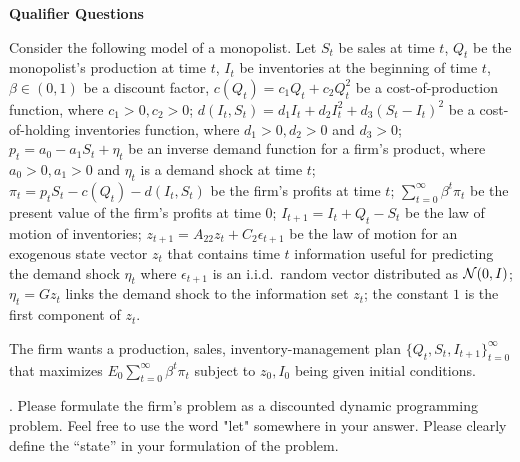 



\paper

\overfullrule=0pt
\def\frac#1#2{#1\over #2}
%
\def\bmatrix#1{\left[ \matrix{#1} \right]}
\def\be{{\beta}}
\def\toone{{t+1}}

\overfullrule=0pt

%

\centerline{\bf Qualifier Questions}




\medskip
{}
  Consider the following model of a monopolist.  Let  $S_t$ be sales at time $t$, $Q_t$ be the monopolist's production  at time $t$,
 $I_t$ be inventories at the beginning of time $t$,  $\beta \in (0,1)$ be a discount factor,  $c(Q_t) = c_1 Q_t + c_2 Q_t^2$ be a cost-of-production function, where $c_1>0, c_2>0$;
  $d(I_t, S_t) = d_1 I_t + d_2 I_t^2  + d_3 (S_t - I_t)^2$ be a cost-of-holding inventories function, where $d_1 >0, d_2 >0 $ and $d_3 >0$;
$p_t = a_0 - a_1 S_t + \eta_t $ be an inverse demand function for a firm's product, where $a_0>0, a_1 >0$ and $\eta_t$ is a demand shock at time  $t$;
   $\pi_t = p_t S_t - c(Q_t) - d(I_t, S_t) $ be the firm's profits at time $t$;
   $\sum_{t=0}^\infty \beta^t \pi_t $ be the present value of the firm's profits at time $0$;  $I_{t+1} = I_t + Q_t - S_t$ be the law of motion of inventories;
 $z_{t+1} = A_{22} z_t + C_2 \epsilon_{t+1} $ be the law of motion for an exogenous state vector $z_t$ that contains time $t$ information useful for predicting the demand shock $\eta_t$ where
 $\epsilon_{t+1}$ is an i.i.d.~random vector distributed as ${\cal N}(0,I)$;
   $\eta_t = G z_t $ links the demand shock to the information set $z_t$;
   the constant $1$ is the first component of $z_t$.

   The firm wants  a production, sales, inventory-management plan $\{Q_t, S_t, I_{t+1}\}_{t=0}^\infty$ that maximizes $E_0 \sum_{t=0}^\infty \beta^t \pi_t $
   subject to $z_0,  I_0 $ being given initial conditions.


 . Please formulate the firm's  problem as a discounted dynamic programming problem.  Feel free to use  the word "let" somewhere in your answer.
 Please clearly define the ``state'' in your formulation of the problem.

